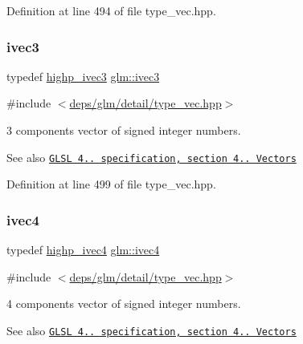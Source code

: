 Definition at line 494 of file type\+\_\+vec.\+hpp.

\mbox{\label{group__core__types_ga6e12a4ca00d696f07da1df4eb73e0fe8}} 
\subsubsection{\texorpdfstring{ivec3}{ivec3}}
{\footnotesize\ttfamily typedef \hyperlink{group__core__precision_ga52ba3edf3183078cf4129e6193b32a2c}{highp\+\_\+ivec3} \hyperlink{group__core__types_ga6e12a4ca00d696f07da1df4eb73e0fe8}{glm\+::ivec3}}



{\ttfamily \#include $<$\hyperlink{type__vec_8hpp}{deps/glm/detail/type\+\_\+vec.\+hpp}$>$}

3 components vector of signed integer numbers.

\begin{DoxySeeAlso}{See also}
\href{http://www.opengl.org/registry/doc/GLSLangSpec.4.20.8.pdf}{\tt G\+L\+SL 4.. specification, section 4.. Vectors} 
\end{DoxySeeAlso}


Definition at line 499 of file type\+\_\+vec.\+hpp.

\mbox{\label{group__core__types_gaa4560ddc50320ea8f8a70d5c9c249fea}} 
\subsubsection{\texorpdfstring{ivec4}{ivec4}}
{\footnotesize\ttfamily typedef \hyperlink{group__core__precision_gaff761e336e3b52f04e725fa85c6d36d1}{highp\+\_\+ivec4} \hyperlink{group__core__types_gaa4560ddc50320ea8f8a70d5c9c249fea}{glm\+::ivec4}}



{\ttfamily \#include $<$\hyperlink{type__vec_8hpp}{deps/glm/detail/type\+\_\+vec.\+hpp}$>$}

4 components vector of signed integer numbers.

\begin{DoxySeeAlso}{See also}
\href{http://www.opengl.org/registry/doc/GLSLangSpec.4.20.8.pdf}{\tt G\+L\+SL 4.. specification, section 4.. Vectors} 
\end{DoxySeeAlso}


